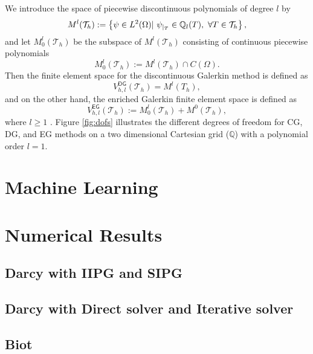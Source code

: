 \documentclass[11pt]{article}
\begin{document}
We  introduce the space of piecewise discontinuous polynomials of degree $l$ by
\begin{equation}
M^l(\mathcal{T}_h) := \left \{ \psi \in L^2(\Omega) | \ \psi_{|_{T}} \in \mathbb{Q}_l(T), \ \forall T \in \mathcal{T}_h \right \}, 
\end{equation}
and let $M_0^l(\mathcal{T}_h)$ be the subspace of $M^l(\mathcal{T}_h)$ consisting of continuous piecewise polynomials
\begin{equation*}
M_0^l(\mathcal{T}_h) := M^l(\mathcal{T}_h) \cap {C}(\Omega). 
\end{equation*}
Then the finite element space for the discontinuous Galerkin method is defined as 
\begin{equation}
V^{\textsf{DG}}_{h,l} (\mathcal{T}_h) =M^l (T_h), 
\end{equation}
and on the other hand, the enriched Galerkin finite element space is defined as
\begin{equation}
V_{h,l}^{\textsf{EG}}(\mathcal{T}_h)  := M^l_0(\mathcal{T}_h) + M^0(\mathcal{T}_h),
\end{equation}
where $l \geq 1$ \cite{BecBurHansLar2003,LeeLeeWhi15,sunliu2009}.
Figure \ref{fig:dofs} illustrates the different degrees of freedom for CG, DG, and EG methods on a two dimensional Cartesian grid ($\mathbb{Q}$) with a polynomial order $l=1$. 



\section{Machine Learning}

\section{Numerical Results}

\subsection{Darcy with IIPG and SIPG}

\subsection{Darcy with Direct solver and Iterative solver}

\subsection{Biot}





%

\end{document}
